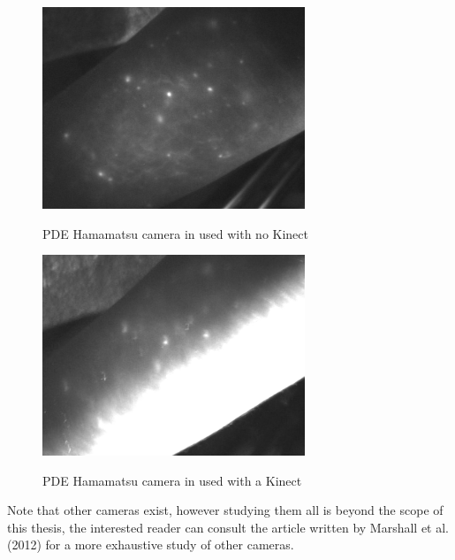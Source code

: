\begin{figure}
\caption{PDE Hamamatsu camera in used with no Kinect}
\centering
    \includegraphics[width=0.7\textwidth]{images/PDEOK.png}
\label{fig:PDEOK}
\end{figure}

\begin{figure}
\caption{PDE Hamamatsu camera in used with a Kinect}
\centering
    \includegraphics[width=0.7\textwidth]{images/PDENotOK.png}
\label{fig:PDENotOK}
\end{figure}

Note that other cameras exist, however studying them all is beyond the scope of this thesis, the interested reader can consult the article written by Marshall et al. (2012) \cite{marshall_near-infrared_2010} for a more exhaustive study of other cameras.


